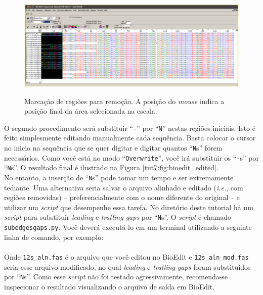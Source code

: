 \begin{refsection}
  \begin{figure}[H]
      {\includegraphics[scale=0.3]{figures/tut7/bioedit_mark.eps}}
	{\caption[Bioedit: marcando regiões de edição]{Marcação de regiões para remoção. A posição do \textit{mouse} indica a posição final da área selecionada na escala.}\label{tut7:fig:bioedit_mark}}
  \end{figure}


O segundo procedimento será substituir ``\texttt{-}'' por ``\texttt{N}'' nestas regiões iniciais. Isto é feito simplesmente editando manualmente cada sequência. Basta colocar o cursor no inicio na sequência que se quer digitar e digitar quantos ``\texttt{N}s'' forem necessários. Como você está no modo ``\texttt{Overwrite}'', você irá substituir os ``\texttt{-}s'' por ``\texttt{N}s''. O resultado final é ilustrado na Figura \ref{tut7:fig:bioedit_edited}.\\

No entanto, a inserção de ``\texttt{N}s'' pode tomar um tempo e ser extremamente tediante. Uma alternativa seria salvar o arquivo alinhado e editado (\textit{i.e.}, com regiões removidas) -- preferencialmente com o nome diferente do original -- e utilizar um \textit{script} que desempenhe essa tarefa. No diretório deste tutorial há um \textit{script} para substituir \textit{leading} e \textit{tralling gaps} por ``\texttt{N}s''. O \textit{script} é chamado \texttt{subedgesgaps.py}. Você deverá executá-lo  em um terminal utilizando a seguinte linha de comando, por exemplo:\\

\\

Onde \texttt{12s\_aln.fas} é o arquivo que você editou no BioEdit e \texttt{12s\_aln\_mod.fas} seria esse arquivo modificado, no qual \textit{leading} e \textit{tralling gaps} foram substituidos por ``\texttt{N}s''. Como esse \textit{script} não foi testado agressivamente, recomenda-se inspecionar o resultado visualizando o arquivo de saída em BioEdit.



\end{refsection}
